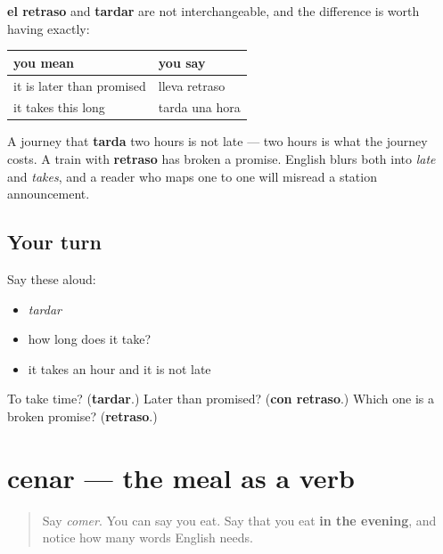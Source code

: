 \begin{grammarlens}[title={Grammar Lens: the delay and the duration}]
\textbf{el retraso} and \textbf{tardar} are not interchangeable, and the difference is worth having exactly:

\noindent
\begin{tabularx}{\linewidth}{@{}>{\raggedright\arraybackslash}X>{\raggedright\arraybackslash}X@{}}
\toprule
\textbf{you mean} & \textbf{you say} \\
\midrule
it is later than promised & lleva retraso \\
it takes this long & tarda una hora \\
\bottomrule
\end{tabularx}

A journey that \textbf{tarda} two hours is not late — two hours is what the journey costs. A train with \textbf{retraso} has broken a promise. English blurs both into \emph{late} and \emph{takes}, and a reader who maps one to one will misread a station announcement.
\end{grammarlens}

\subsection*{Your turn}
Say these aloud:

\begin{itemize}
\raggedright
  \item \emph{tardar}
  \item how long does it take?
  \item it takes an hour and it is not late
\end{itemize}

\begin{tcolorbox}[breakable,colback=teal!4,colframe=teal!35!black,title={Before you move on}]
To take time? (\textbf{tardar}.) Later than promised? (\textbf{con retraso}.) Which one is a broken promise? (\textbf{retraso}.)
\end{tcolorbox}
\section[cenar]{cenar — the meal as a verb}

\label{lesson:ES-C437-cenar}



\begin{quote}
Say \emph{comer}. You can say you eat. Say that you eat \textbf{in the evening}, and notice how many words English needs.
\end{quote}

